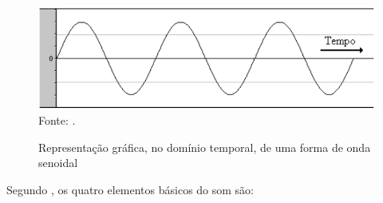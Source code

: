 \begin{figure}[!htb]
   \centering
   \caption{Representação gráfica, no domínio temporal, de uma forma de onda senoidal}\label{fig:ondaSenoidal} 
   \includegraphics[scale=0.50]{figuras/ondaSenoidal.png}
   \\Fonte: \cite{miletto2004}.
\end{figure}

Segundo , os quatro elementos básicos do som são:
